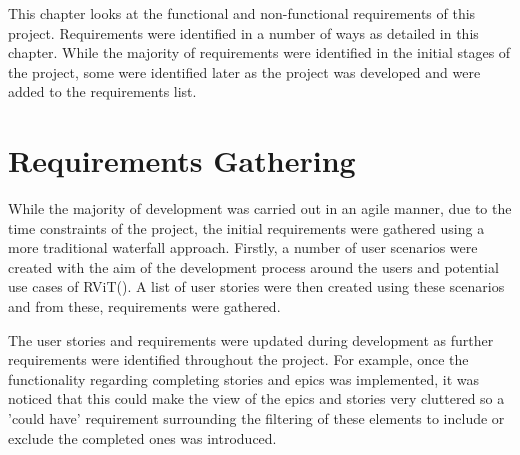 \documentclass[l4proj.tex]{subfiles}
\begin{document}
    

This chapter looks at the functional and non-functional requirements of this project. Requirements were identified in a number of ways as detailed in this chapter. While the majority of requirements were identified in the initial stages of the project, some were identified later as the project was developed and were added to the requirements list.

\section{Requirements Gathering}
While the majority of development was carried out in an agile manner, due to the time constraints of the project, the initial requirements were gathered using a more traditional waterfall approach. Firstly, a number of user scenarios were created with the aim of the development process around the users and potential use cases of RViT(\cite{Evans2005}). A list of user stories were then created using these scenarios and from these, requirements were gathered.

The user stories and requirements were updated during development as further requirements were identified throughout the project. For example, once the functionality regarding completing stories and epics was implemented, it was noticed that this could make the view of the epics and stories very cluttered so a 'could have' requirement surrounding the filtering of these elements to include or exclude the completed ones was introduced.
 
\end{document}
